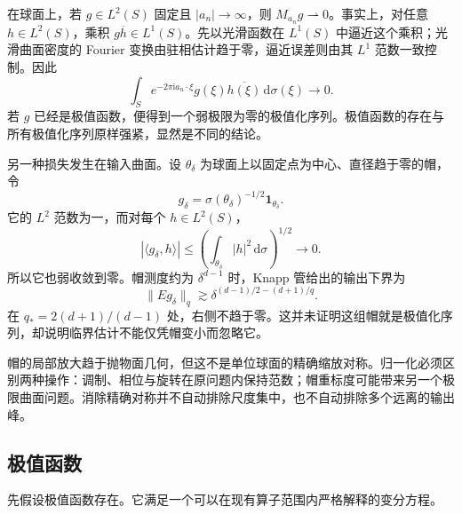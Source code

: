 \ProseParagraphBreak
在球面上，若 \(g\in L^2(S)\) 固定且 \(|a_n|\to\infty\)，则 \(M_{a_n}g\rightharpoonup0\)。事实上，对任意 \(h\in L^2(S)\)，乘积 \(g\overline h\in L^1(S)\)。先以光滑函数在 \(L^1(S)\) 中逼近这个乘积；光滑曲面密度的 Fourier 变换由驻相估计趋于零，逼近误差则由其 \(L^1\) 范数一致控制。因此
\[
 \int_S e^{-2\pi\mathrm i a_n\cdot\xi}
      g(\xi)\overline{h(\xi)}\,\mathrm d\sigma(\xi)\longrightarrow0.
\]
若 \(g\) 已经是极值函数，便得到一个弱极限为零的极值化序列。极值函数的存在与所有极值化序列原样强紧，显然是不同的结论。

\ProseParagraphBreak
另一种损失发生在输入曲面。设 \(\theta_\delta\) 为球面上以固定点为中心、直径趋于零的帽，令
\[
 g_\delta=\sigma(\theta_\delta)^{-1/2}\mathbf1_{\theta_\delta}.
\]
它的 \(L^2\) 范数为一，而对每个 \(h\in L^2(S)\)，
\[
 |\langle g_\delta,h\rangle|
 \leq\left(\int_{\theta_\delta}|h|^2\,\mathrm d\sigma\right)^{1/2}
 \longrightarrow0.
\]
所以它也弱收敛到零。帽测度约为 \(\delta^{d-1}\) 时，Knapp 管给出的输出下界为
\[
 \|Eg_\delta\|_q
 \gtrsim \delta^{(d-1)/2-(d+1)/q}.
\]
在 \(q_*=2(d+1)/(d-1)\) 处，右侧不趋于零。这并未证明这组帽就是极值化序列，却说明临界估计不能仅凭帽变小而忽略它。

帽的局部放大趋于抛物面几何，但这不是单位球面的精确缩放对称。归一化必须区别两种操作：调制、相位与旋转在原问题内保持范数；帽重标度可能带来另一个极限曲面问题。消除精确对称并不自动排除尺度集中，也不自动排除多个远离的输出峰。

\subsection{极值函数}
\label{b2:subsec:230504}

先假设极值函数存在。它满足一个可以在现有算子范围内严格解释的变分方程。

